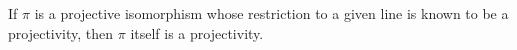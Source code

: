 If $\pi$ is a projective isomorphism whose restriction to a given line is known to be a projectivity, then $\pi$ itself is a projectivity.
